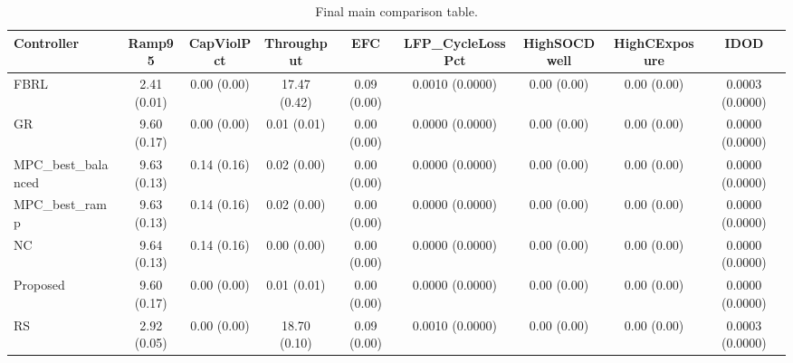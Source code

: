 \begin{table}[t]
\centering
\caption{Final main comparison table.}
\label{tab:results_final_auto}
\begin{tabular}{lcccccccc}
\toprule
Controller & Ramp95 & CapViolPct & Throughput & EFC & LFP\_CycleLossPct & HighSOCDwell & HighCExposure & IDOD \\
\midrule
FBRL & 2.41 (0.01) & 0.00 (0.00) & 17.47 (0.42) & 0.09 (0.00) & 0.0010 (0.0000) & 0.00 (0.00) & 0.00 (0.00) & 0.0003 (0.0000) \\
GR & 9.60 (0.17) & 0.00 (0.00) & 0.01 (0.01) & 0.00 (0.00) & 0.0000 (0.0000) & 0.00 (0.00) & 0.00 (0.00) & 0.0000 (0.0000) \\
MPC\_best\_balanced & 9.63 (0.13) & 0.14 (0.16) & 0.02 (0.00) & 0.00 (0.00) & 0.0000 (0.0000) & 0.00 (0.00) & 0.00 (0.00) & 0.0000 (0.0000) \\
MPC\_best\_ramp & 9.63 (0.13) & 0.14 (0.16) & 0.02 (0.00) & 0.00 (0.00) & 0.0000 (0.0000) & 0.00 (0.00) & 0.00 (0.00) & 0.0000 (0.0000) \\
NC & 9.64 (0.13) & 0.14 (0.16) & 0.00 (0.00) & 0.00 (0.00) & 0.0000 (0.0000) & 0.00 (0.00) & 0.00 (0.00) & 0.0000 (0.0000) \\
Proposed & 9.60 (0.17) & 0.00 (0.00) & 0.01 (0.01) & 0.00 (0.00) & 0.0000 (0.0000) & 0.00 (0.00) & 0.00 (0.00) & 0.0000 (0.0000) \\
RS & 2.92 (0.05) & 0.00 (0.00) & 18.70 (0.10) & 0.09 (0.00) & 0.0010 (0.0000) & 0.00 (0.00) & 0.00 (0.00) & 0.0003 (0.0000) \\
\bottomrule
\end{tabular}
\end{table}